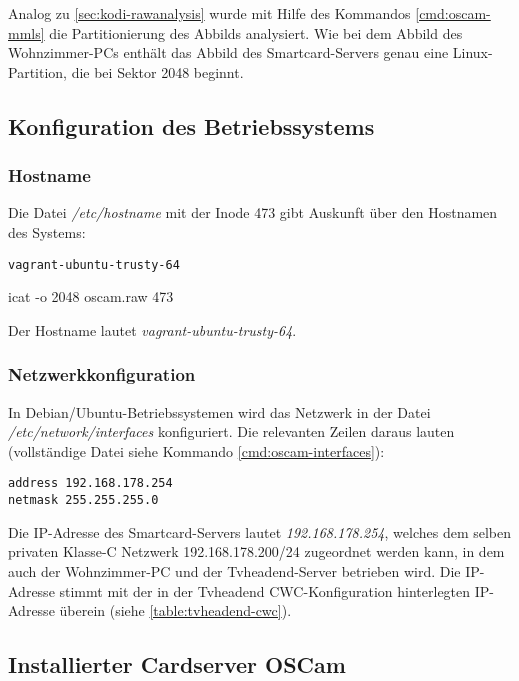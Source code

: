 Analog zu \autoref{sec:kodi-rawanalysis} wurde mit Hilfe des Kommandos \autoref{cmd:oscam-mmls} die Partitionierung des Abbilds analysiert. Wie bei dem Abbild des Wohnzimmer-PCs enthält das Abbild des Smartcard-Servers genau eine Linux-Partition, die bei Sektor 2048 beginnt.

\subsection{Konfiguration des Betriebssystems}

\subsubsection{Hostname}
\label{sec:oscam-hostname}

Die Datei \textit{/etc/hostname} mit der Inode 473 gibt Auskunft über den Hostnamen des Systems:

\begin{cmd}
\begin{verbatim}
vagrant-ubuntu-trusty-64
\end{verbatim}
\caption{icat -o 2048 oscam.raw 473}
\end{cmd}

Der Hostname lautet \textit{vagrant-ubuntu-trusty-64}.

\subsubsection{Netzwerkkonfiguration}
\label{sec:cardserver-network}

In Debian/Ubuntu-Betriebssystemen wird das Netzwerk in der Datei \textit{/etc/network/interfaces} konfiguriert. Die relevanten Zeilen daraus lauten (vollständige Datei siehe Kommando \autoref{cmd:oscam-interfaces}):

\begin{verbatim}
address 192.168.178.254
netmask 255.255.255.0
\end{verbatim}

Die IP-Adresse des Smartcard-Servers lautet \textit{192.168.178.254}, welches dem selben privaten \mbox{Klasse-C} Netzwerk 192.168.178.200/24 zugeordnet werden kann, in dem auch der Wohnzimmer-PC und der Tvheadend-Server betrieben wird. Die IP-Adresse stimmt mit der in der Tvheadend CWC-Konfiguration hinterlegten IP-Adresse überein (siehe \autoref{table:tvheadend-cwc}).

\subsection{Installierter Cardserver OSCam}

